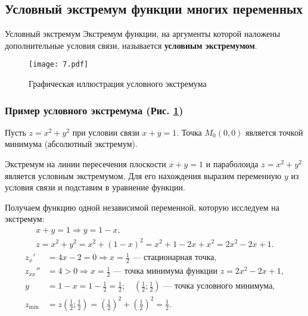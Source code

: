 \subsection{Условный экстремум функции многих переменных}
\begin{tbox}{Условный экстремум}
	Экстремум функции, на аргументы которой наложены дополнительные условия связи, называется \textbf{условным экстремумом}.
\end{tbox}

\begin{figure}[h]
	\centering
	\begin{minipage}[c]{0.4\linewidth} %
		\centering
		\texttt{[image: 7.pdf]} %
		\caption{Графическая иллюстрация условного экстремума}
		\label{fig:17}
	\end{minipage}
\end{figure}

\subsubsection*{Пример условного экстремума (Рис. \ref{fig:17})}
Пусть $z = x^2 + y^2$ при условии связи $x + y = 1$. Точка $M_0(0, 0)$ является точкой минимума (абсолютный экстремум).

Экстремум на линии пересечения плоскости $x + y = 1$ и параболоида $z = x^2 + y^2$ является условным экстремумом. Для его нахождения выразим переменную $y$ из условия связи и подставим в уравнение функции.

Получаем функцию одной независимой переменной, которую исследуем на экстремум:
\begin{gather*}
	x + y = 1 \Rightarrow y = 1 - x, \\
	z = x^2 + y^2 = x^2 + (1 - x)^2 = x^2 + 1 - 2x + x^2 = 2x^2 - 2x + 1.
\end{gather*}
\begin{align*}
	z_x' &= 4x - 2 = 0 \Rightarrow x = \frac{1}{2} \text{ — стационарная точка}, \\
	z_{xx}'' &= 4 > 0 \Rightarrow x = \frac{1}{2} \text{ — точка минимума функции } z = 2x^2 - 2x + 1, \\
	y &= 1 - x = 1 - \frac{1}{2} = \frac{1}{2}; \quad \left(\frac{1}{2}; \frac{1}{2}\right) \text{ — точка условного минимума}, \\
	z_{\text{min}} &= z\left(\frac{1}{2}; \frac{1}{2}\right) = \left(\frac{1}{2}\right)^2 + \left(\frac{1}{2}\right)^2 = \frac{1}{2}.
\end{align*}

